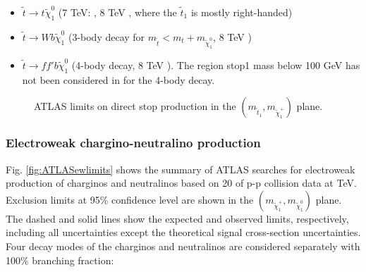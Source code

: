 \begin{itemize}
\item $\tilde{t} \rightarrow t \tilde{\chi}^0_1$ (7 TeV: \cite{atlas:stoplim_1} \cite{atlas:stoplim_2} \cite{atlas:stoplim_3}, 8 TeV \cite{atlas:stoplim_4} \cite{atlas:stoplim_5} \cite{atlas:stoplim_6}, where the $\tilde{t}_1$ is mostly right-handed)


\item $\tilde{t} \rightarrow W b  \tilde{\chi}^0_1$ (3-body decay for $m_{\tilde{t}} < m_t + m_{\tilde{\chi}^0_1} $, 8 TeV \cite{atlas:stoplim_4}\cite{atlas:stoplim_6}) 

\item  $\tilde{t} \rightarrow f f' b  \tilde{\chi}^0_1$ (4-body decay, 8 TeV \cite{atlas:stoplim_4}\cite{atlas:stoplim_7}). The region stop1 mass below 100 GeV has not been considered in \cite{atlas:stoplim_4} for the 4-body decay. 

\end{itemize}

\begin{figure}[htbp]
\begin{center}
\end{center}
\caption[ATLAS limits on direct stop production]{ATLAS limits on direct stop production in the $\left( m_{\tilde{t}_1}, m_{\tilde{\chi}^+_1} \right)$ plane.}
\label{fig:ATLASstoplimits}
\end{figure}



\subsubsection{Electroweak chargino-neutralino production}

Fig. \ref{fig:ATLASewlimits} shows the summary of ATLAS searches for electroweak production of charginos and neutralinos based on 20 \ifb of p-p collision data at \cmotto TeV. Exclusion limits at 95\% confidence level are shown in the $\left( m_{\tilde{\chi}^+_1}, m_{\tilde{\chi}^0_1}  \right)$ plane. The dashed and solid lines show the expected and observed limits, respectively, including all uncertainties except the theoretical signal cross-section uncertainties. Four decay modes of the charginos and neutralinos are considered separately with 100\% branching fraction: 

